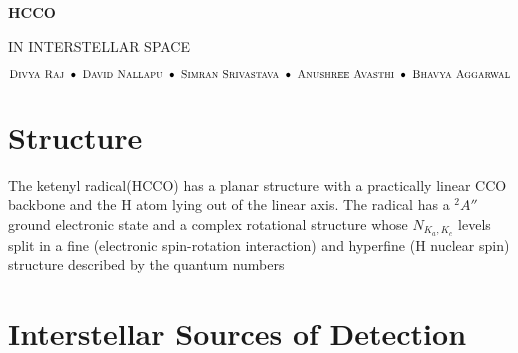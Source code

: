 \documentclass[12 pt]{article}
\begin{document}
	
	\begin{center}
		
		\begin{Huge}
		\textbf{HCCO}
		\end{Huge}
			
		\begin{Large}
		\textsc{IN INTERSTELLAR SPACE\linebreak}
		\end{Large}
		
		\begin{scriptsize}
		$
		\textsc{Divya Raj }\bullet\textsc{ David Nallapu }\bullet\textsc{ Simran Srivastava }\bullet\textsc{ Anushree Avasthi }\bullet						\textsc{ Bhavya Aggarwal}	
		$
		\end{scriptsize}
				
	\end{center}
	
	\section*{Structure}
		The  ketenyl  radical(HCCO) has  a  planar  structure  with  a  practically  linear  CCO  backbone  and  the  H  atom  lying  out  of  			the	linear  axis.  The  radical  has a ${}^2A''$ ground  electronic  state  and a  complex  rotational  structure  whose $N_{K_a,K_c}$ 			levels  split in  a	fine (electronic spin-rotation interaction) and hyperfine (H nuclear  spin)  structure  described  by  the  quantum  		numbers
		
	\section*{Interstellar Sources of Detection}
		
	
\end{document}
